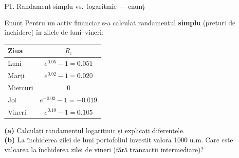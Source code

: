 \documentclass[9pt, aspectratio=169, t]{beamer}
\begin{document}
\begin{frame}{P1. Randament simplu vs.\ logaritmic --- enunț}
\begin{block}{Enunț}
Pentru un activ financiar s-a calculat randamentul \textbf{simplu} (prețuri de închidere) în zilele de luni--vineri:
\begin{center}\small
\begin{tabular}{lc}\toprule
Ziua & $R_t$ \\\midrule
Luni     & $e^{0.05}-1=0.051$\\
Marți    & $e^{0.02}-1=0.020$\\
Miercuri & $0$\\
Joi      & $e^{-0.02}-1=-0.019$\\
Vineri   & $e^{0.10}-1=0.105$\\\bottomrule
\end{tabular}
\end{center}
\textbf{(a)} Calculați randamentul logaritmic și explicați diferențele.\\
\textbf{(b)} La închiderea zilei de luni portofoliul investit valora 1000 u.m. Care este valoarea la închiderea zilei de vineri (fără tranzacții intermediare)?
\end{block}
\end{frame}
\end{document}
